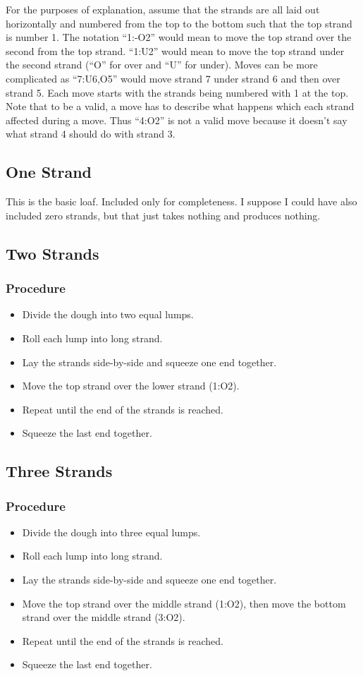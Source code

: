 \documentclass[10pt, openany]{book}
\begin{document}
For the purposes of explanation, assume that the strands are all laid out horizontally and numbered from the top to the bottom such that the top strand is number 1.  The notation ``1:-O2'' would mean to move the top strand over the second from the top strand.  ``1:U2'' would mean to move the top strand under the second strand (``O'' for over and ``U'' for under).  Moves can be more complicated as ``7:U6,O5'' would move strand 7 under strand 6 and then over strand 5.  Each move starts with the strands being numbered with 1 at the top.  Note that to be a valid, a move has to describe what happens which each strand affected during a move.  Thus ``4:O2'' is not a valid move because it doesn't say what strand 4 should do with strand 3.

\subsection{One Strand}
This is the basic loaf.  Included only for completeness.  I suppose I could have also included zero strands, but that just takes nothing and produces nothing.

\subsection{Two Strands}
\subsubsection{Procedure}
\begin{itemize}
  \item Divide the dough into two equal lumps.
  \item Roll each lump into long strand.
  \item Lay the strands side-by-side and squeeze one end together.
  \item Move the top strand over the lower strand (1:O2).
  \item Repeat until the end of the strands is reached.
  \item Squeeze the last end together.
\end{itemize}

\subsection{Three Strands}
\subsubsection{Procedure}
\begin{itemize}
  \item Divide the dough into three equal lumps.
  \item Roll each lump into long strand.
  \item Lay the strands side-by-side and squeeze one end together.
  \item Move the top strand over the middle strand (1:O2), then move the bottom strand over the middle strand (3:O2).
  \item Repeat until the end of the strands is reached.
  \item Squeeze the last end together.
\end{itemize}
\end{document}
